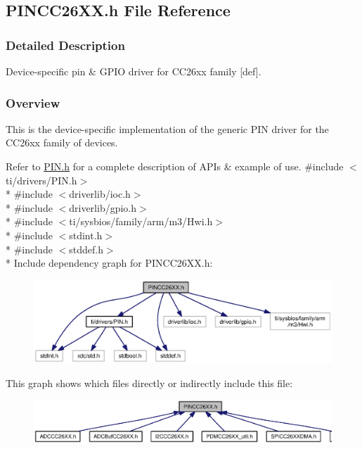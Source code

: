 \subsection{P\+I\+N\+C\+C26\+X\+X.\+h File Reference}
\label{_p_i_n_c_c26_x_x_8h}


\subsubsection{Detailed Description}
Device-\/specific pin \& G\+P\+I\+O driver for C\+C26xx family \mbox{[}def\mbox{]}. 





\subsubsection*{Overview}

This is the device-\/specific implementation of the generic P\+I\+N driver for the C\+C26xx family of devices.

Refer to \hyperlink{_p_i_n_8h}{P\+I\+N.\+h} for a complete description of A\+P\+Is \& example of use. {\ttfamily \#include $<$ti/drivers/\+P\+I\+N.\+h$>$}\\*
{\ttfamily \#include $<$driverlib/ioc.\+h$>$}\\*
{\ttfamily \#include $<$driverlib/gpio.\+h$>$}\\*
{\ttfamily \#include $<$ti/sysbios/family/arm/m3/\+Hwi.\+h$>$}\\*
{\ttfamily \#include $<$stdint.\+h$>$}\\*
{\ttfamily \#include $<$stddef.\+h$>$}\\*
Include dependency graph for P\+I\+N\+C\+C26\+X\+X.\+h\+:
\nopagebreak
\begin{figure}[H]
\begin{center}
\leavevmode
\includegraphics[width=350pt]{_p_i_n_c_c26_x_x_8h__incl}
\end{center}
\end{figure}
This graph shows which files directly or indirectly include this file\+:
\nopagebreak
\begin{figure}[H]
\begin{center}
\leavevmode
\includegraphics[width=350pt]{_p_i_n_c_c26_x_x_8h__dep__incl}
\end{center}
\end{figure}
